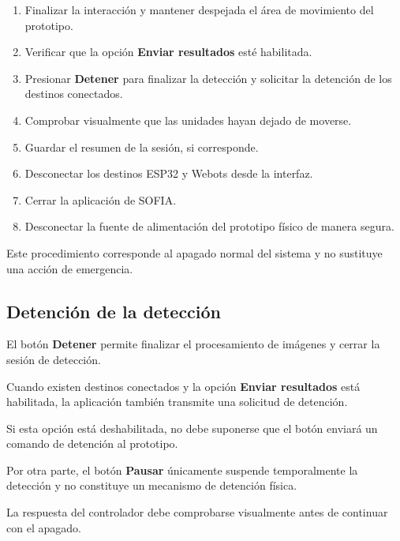 \documentclass[letterpaper,journal]{IEEEtran}
\begin{document}
\begin{enumerate}
    \item Finalizar la interacción
    y mantener despejada el área
    de movimiento del prototipo.

    \item Verificar que la opción
    \textbf{Enviar resultados}
    esté habilitada.

    \item Presionar \textbf{Detener}
    para finalizar la detección
    y solicitar la detención
    de los destinos conectados.

    \item Comprobar visualmente que
    las unidades hayan dejado
    de moverse.

    \item Guardar el resumen
    de la sesión, si corresponde.

    \item Desconectar los destinos
    ESP32 y Webots desde la interfaz.

    \item Cerrar la aplicación
    de SOFIA.

    \item Desconectar la fuente
    de alimentación del prototipo
    físico de manera segura.
\end{enumerate}

Este procedimiento corresponde
al apagado normal del sistema
y no sustituye una acción
de emergencia.

\subsection{Detención de la detección}

El botón \textbf{Detener} permite
finalizar el procesamiento de imágenes
y cerrar la sesión de detección.

Cuando existen destinos conectados
y la opción \textbf{Enviar resultados}
está habilitada, la aplicación
también transmite una solicitud
de detención.

Si esta opción está deshabilitada,
no debe suponerse que el botón
enviará un comando de detención
al prototipo.

Por otra parte, el botón
\textbf{Pausar} únicamente suspende
temporalmente la detección y
no constituye un mecanismo
de detención física.

La respuesta del controlador
debe comprobarse visualmente
antes de continuar con el apagado.
\end{document}
